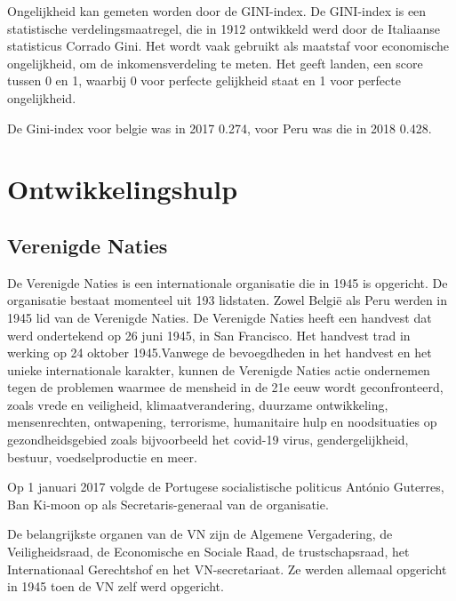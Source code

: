 Ongelijkheid kan gemeten worden door de GINI-index. De GINI-index is een statistische verdelingsmaatregel, die in 1912 ontwikkeld werd door de Italiaanse statisticus Corrado Gini. Het wordt vaak gebruikt als maatstaf voor economische ongelijkheid, om de inkomensverdeling te meten. Het geeft landen, een score tussen 0 en 1, waarbij 0 voor perfecte gelijkheid staat en 1 voor perfecte ongelijkheid.  \autocite{Chappelow2020}


De Gini-index voor belgie was in 2017 0.274, voor Peru was die in 2018 0.428. \autocite{Bank2018}


\section{Ontwikkelingshulp}

\subsection{Verenigde Naties}
De Verenigde Naties is een internationale organisatie die in 1945 is opgericht. De organisatie bestaat momenteel uit 193 lidstaten. Zowel België als Peru werden in 1945 lid van de Verenigde Naties. De Verenigde Naties heeft een handvest dat werd ondertekend op 26 juni 1945, in San Francisco. Het handvest trad in werking op 24 oktober 1945.Vanwege de bevoegdheden in het handvest en het unieke internationale karakter, kunnen de Verenigde Naties actie ondernemen tegen de problemen waarmee de mensheid in de 21e eeuw wordt geconfronteerd, zoals vrede en veiligheid, klimaatverandering, duurzame ontwikkeling, mensenrechten, ontwapening, terrorisme, humanitaire hulp en noodsituaties op gezondheidsgebied zoals bijvoorbeeld het covid-19 virus, gendergelijkheid, bestuur, voedselproductie en meer. \autocite{Nations2020}

Op 1 januari 2017 volgde de Portugese socialistische politicus António Guterres, Ban Ki-moon op als Secretaris-generaal van de organisatie. 

De belangrijkste organen van de VN zijn de Algemene Vergadering, de Veiligheidsraad, de Economische en Sociale Raad, de trustschapsraad, het Internationaal Gerechtshof en het VN-secretariaat. Ze werden allemaal opgericht in 1945 toen de VN zelf werd opgericht. 

